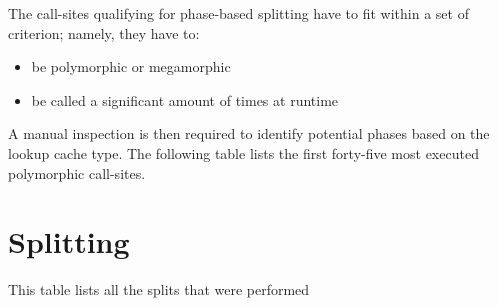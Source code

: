 \documentclass[preprint]{acmart}
\begin{document}
The call-sites qualifying for phase-based splitting have to fit within a set of criterion; namely, they have to:
 \begin{itemize}
 \item be polymorphic or megamorphic
 \item be called a significant amount of times at runtime
 \end{itemize}

A manual inspection is then required to identify potential phases based on the lookup cache type. The following table lists the first forty-five most executed polymorphic call-sites.

\begin{landscape}

\SuperHottestMegamorphic{}

\end{landscape}

\appendix

\section{Splitting}

This table lists all the splits that were performed

\EffectSplitting



\end{document}

